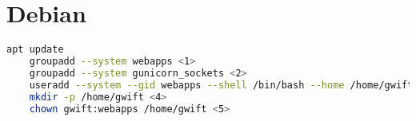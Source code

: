 \section{Debian}

\begin{lstlisting}[language=bash]
    apt update
    groupadd --system webapps <1>
    groupadd --system gunicorn_sockets <2>
    useradd --system --gid webapps --shell /bin/bash --home /home/gwift gwift <3>
    mkdir -p /home/gwift <4>
    chown gwift:webapps /home/gwift <5>
\end{lstlisting}
